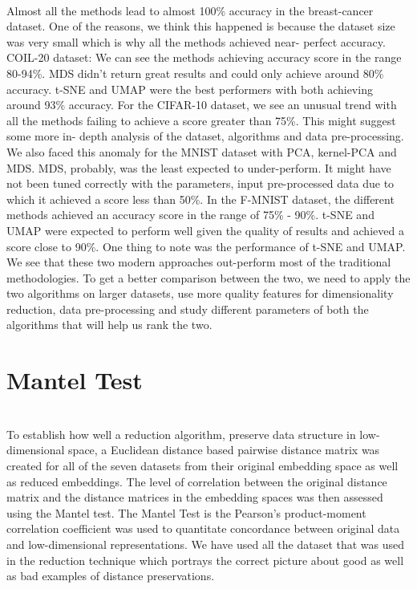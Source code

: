 \documentclass[letterpaper, 10 pt, conference]{ieeeconf}  %
\begin{document}
\\Almost all the methods lead to almost 100\% accuracy in the breast-cancer dataset. One of the reasons, we think this happened is because the dataset size was very small which is why all the methods achieved near- perfect accuracy. COIL-20 dataset: We can see the methods achieving accuracy score in the range 80-94\%. MDS didn’t return great results and could only achieve around 80\% accuracy. t-SNE and UMAP were the best performers with both achieving around 93\% accuracy. For the CIFAR-10 dataset, we see an unusual trend with all the methods failing to achieve a score greater than 75\%. This might suggest some more in- depth analysis of the dataset, algorithms and data pre-processing. We also faced this anomaly for the MNIST dataset with PCA, kernel-PCA and MDS. MDS, probably, was the least expected to under-perform. It might have not been tuned correctly with the parameters, input pre-processed data due to which it achieved a score less than 50\%. In the F-MNIST dataset, the different methods achieved an accuracy score in the range of 75\% - 90\%. t-SNE and UMAP were expected to perform well given the quality of results and achieved a score close to 90\%. One thing to note was the performance of t-SNE and UMAP. We see that these two modern approaches out-perform most of the traditional methodologies. To get a better comparison between the two, we need to apply the two algorithms on larger datasets, use more quality features for dimensionality reduction, data pre-processing and study different parameters of both the algorithms that will help us rank the two.

\section{Mantel Test}
\\To establish how well a reduction algorithm, preserve data structure in low-dimensional space, a Euclidean distance based pairwise distance matrix was created for all of the seven datasets from their original embedding space as well as reduced embeddings. The level of correlation between the original distance matrix and the distance matrices in the embedding spaces was then assessed using the Mantel test. The Mantel Test is the Pearson’s product-moment correlation coefficient was used to quantitate concordance between original data and low-dimensional representations. We have used all the dataset that was used in the reduction technique which portrays the correct picture about good as well as bad examples of distance preservations.
\end{document}
